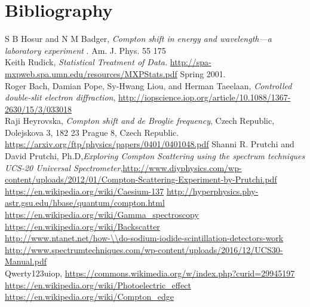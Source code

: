 \documentclass[%
 reprint,
 amsmath,amssymb,
 aps,
]{revtex4-1}
\begin{document}
\section{\label{sec:level5}Bibliography}
\begin{thebibliography}{50}
S B Hosur and N M Badger,
\textit{Compton shift in energy and wavelength—a laboratory experiment
}. Am. J. Phys. 55 175\\
 Keith Rudick, 
\textit{Statistical Treatment of Data.}
\url{http://spa-mxpweb.spa.umn.edu/resources/MXPStats.pdf}
Spring 2001.\\
Roger Bach, Damian Pope, Sy-Hwang Liou, and Herman Taeelaan, \textit{Controlled double-slit electron diffraction},  \url{http://iopscience.iop.org/article/10.1088/1367-2630/15/3/033018}\\
 Raji Heyrovska, \textit{Compton shift and de Broglie frequency}, Czech Republic, Dolejskova 3, 182 23 Prague 8, Czech Republic.  \url{https://arxiv.org/ftp/physics/papers/0401/0401048.pdf}
 Shanni R. Prutchi and David Prutchi, Ph.D,\textit{Exploring Compton Scattering using the spectrum techniques UCS-20 Universal Spectrometer},\url{http://www.diyphysics.com/wp-content/uploads/2012/01/Compton-Scattering-Experiment-by-Prutchi.pdf}
\url{https://en.wikipedia.org/wiki/Caesium-137}
\url{http://hyperphysics.phy-astr.gsu.edu/hbase/quantum/compton.html}
  \url{https://en.wikipedia.org/wiki/Gamma_spectroscopy}\\
\url{ https://en.wikipedia.org/wiki/Backscatter}\\
 \url{http://www.ntanet.net/how-\\do-sodium-iodide-scintillation-detectors-work}\\
 \url{http://www.spectrumtechniques.com/wp-content/uploads/2016/12/UCS30-Manual.pdf}\\
 Qwerty123uiop, \url{https://commons.wikimedia.org/w/index.php?curid=29945197}\\
 \url{https://en.wikipedia.org/wiki/Photoelectric_effect}\\
 \url{https://en.wikipedia.org/wiki/Compton_edge}\\
\end{thebibliography}
\end{document}
